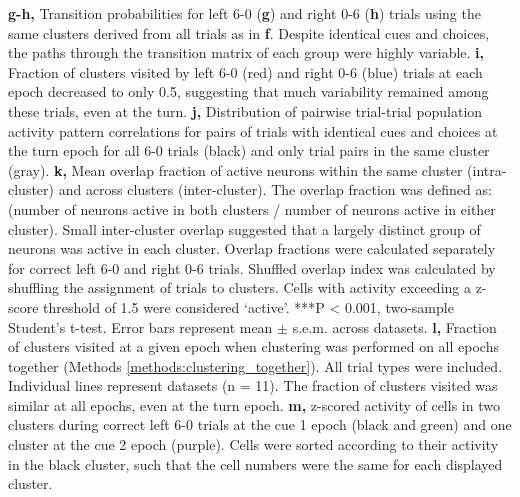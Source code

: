 \begin{FPfigure}
{%
\textbf{g-h,} Transition probabilities for left 6-0 (\textbf{g}) and right 0-6 (\textbf{h}) trials using the same clusters derived from all trials as in \textbf{f}. Despite identical cues and choices, the paths through the transition matrix of each group were highly variable. 
%
\textbf{i,} Fraction of clusters visited by left 6-0 (red) and right 0-6 (blue) trials at each epoch decreased to only 0.5, suggesting that much variability remained among these trials, even at the turn. 
%
\textbf{j,} Distribution of pairwise trial-trial population activity pattern correlations for pairs of trials with identical cues and choices at the turn epoch for all 6-0 trials (black) and only trial pairs in the same cluster (gray). 
%
\textbf{k,} Mean overlap fraction of active neurons within the same cluster (intra-cluster) and across clusters (inter-cluster). The overlap fraction was defined as: (number of neurons active in both clusters / number of neurons active in either cluster). Small inter-cluster overlap suggested that a largely distinct group of neurons was active in each cluster. Overlap fractions were calculated separately for correct left 6-0 and right 0-6 trials. Shuffled overlap index was calculated by shuffling the assignment of trials to clusters. Cells with activity exceeding a z-score threshold of 1.5 were considered `active'. ***P < 0.001, two-sample Student's t-test. Error bars represent mean $\pm$ s.e.m. across datasets. 
%
\textbf{l,} Fraction of clusters visited at a given epoch when clustering was performed on all epochs together (Methods \ref{methods:clustering_together}). All trial types were included. Individual lines represent datasets (n = 11). The fraction of clusters visited was similar at all epochs, even at the turn epoch. 
%
\textbf{m,} z-scored activity of cells in two clusters during correct left 6-0 trials at the cue 1 epoch (black and green) and one cluster at the cue 2 epoch (purple). Cells were sorted according to their activity in the black cluster, such that the cell numbers were the same for each displayed cluster. 
\label{fig:3_6}}
\end{FPfigure}
\clearpage


